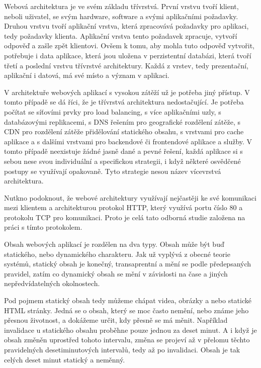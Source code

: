 \documentclass[12pt]{article}
\begin{document}
Webová architektura je ve svém základu třívrstvá. První vrstvu tvoří klient, neboli uživatel, se svým hardware, software a svými aplikačními požadavky. Druhou vrstvu tvoří aplikační vrstva, která zpracovává požadavky pro aplikaci, tedy požadavky klienta. Aplikační vrstva tento požadavek zpracuje, vytvoří odpověď a zašle zpět klientovi. Ovšem k tomu, aby mohla tuto odpověď vytvořit, potřebuje i data aplikace, která jsou uložena v perzistentní databázi, která tvoří třetí a poslední vrstvu třívrstvé architektury. Každá z vrstev, tedy prezentační, aplikační i datová, má své místo a význam v aplikaci.\cite{tri-vrstvy}

\obrazek
{}

V architektuře webových aplikací s vysokou zátěží už je potřeba jiný přístup. V tomto případě se dá říci, že je třívrstvá architektura nedostačující. Je potřeba počítat se síťovími prvky pro load balancing, s více aplikačními uzly, s databázovými replikacemi, s DNS řešením pro geografické rozdělení zátěže, s CDN pro rozdělení zátěže přidělování statického obsahu, s vrstvami pro cache aplikace a s dalšími vrstvami pro backendové či frontendové aplikace a služby. V tomto případě neexistuje žádné jasně dané a pevné řešení, každá aplikace si s sebou nese svou individuální a specifickou strategii, i když některé osvědčené postupy se využívají opakovaně. Tyto strategie nesou název vícevrstvá architektura.

\obrazek
{}

Nutkno podoknout, že webové architektury využívají nejčastěji ke své komunikaci mezi klientem a architekturou protokol HTTP, který využívá portu číslo 80 a protokolu TCP pro komunikaci. Proto je celá tato odborná studie založena na práci s tímto protokolem.

Obsah webových aplikací je rozdělen na dva typy. Obsah může být buď statického, nebo dynamického charakteru. Jak už vyplývá z obecné teorie systémů, statický obsah je konečný, transaprentní a mění se podle předepsaných pravidel, zatím co dynamický obsah se mění v závislosti na čase a jiných nepředvídatelných okolnostech. 

Pod pojmem statický obsah tedy můžeme chápat videa, obrázky a nebo statické HTML stránky. Jedná se o obsah, který se moc často nemění, nebo známe jeho přesnou životnost, a dokážeme určit, kdy přesně se má měnit. Například invalidace u statického obsahu proběhne pouze jednou za deset minut. A i když je obsah změněn uprostřed tohoto intervalu, změna se projeví až v přelomu těchto pravidelných desetiminutových intervalů, tedy až po invalidaci. Obsah je tak celých deset minut statický a neměnný.
\end{document}
